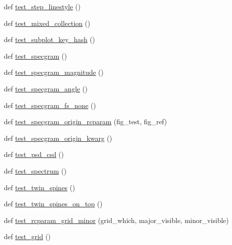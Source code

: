 \begin{DoxyCompactItemize}
def \hyperlink{namespacematplotlib_1_1tests_1_1test__axes_a3968f74ade34455d4fd9fc6a8c9f79fa}{test\+\_\+step\+\_\+linestyle} ()
\item 
def \hyperlink{namespacematplotlib_1_1tests_1_1test__axes_a5b3e3426d068fceaa96eb7402df6659e}{test\+\_\+mixed\+\_\+collection} ()
\item 
def \hyperlink{namespacematplotlib_1_1tests_1_1test__axes_abaa329e6b97af2289901e8470f4247af}{test\+\_\+subplot\+\_\+key\+\_\+hash} ()
\item 
def \hyperlink{namespacematplotlib_1_1tests_1_1test__axes_a42e09b62c07363864a009c6f719c16c6}{test\+\_\+specgram} ()
\item 
def \hyperlink{namespacematplotlib_1_1tests_1_1test__axes_a5d44d9810a3bea5b16c7dbfaadf011e2}{test\+\_\+specgram\+\_\+magnitude} ()
\item 
def \hyperlink{namespacematplotlib_1_1tests_1_1test__axes_a47b44086a29a8443df1f15fe6037384b}{test\+\_\+specgram\+\_\+angle} ()
\item 
def \hyperlink{namespacematplotlib_1_1tests_1_1test__axes_a409613fae86479e6aecf81f7f05dfb10}{test\+\_\+specgram\+\_\+fs\+\_\+none} ()
\item 
def \hyperlink{namespacematplotlib_1_1tests_1_1test__axes_acec6383a70126a71095e0bd77bb74a1c}{test\+\_\+specgram\+\_\+origin\+\_\+rcparam} (fig\+\_\+test, fig\+\_\+ref)
\item 
def \hyperlink{namespacematplotlib_1_1tests_1_1test__axes_a9d43d34c8d202b7fef3b8f85dbc5a52b}{test\+\_\+specgram\+\_\+origin\+\_\+kwarg} ()
\item 
def \hyperlink{namespacematplotlib_1_1tests_1_1test__axes_af47a1b688e1a35d8c6c4a29e396eb7f4}{test\+\_\+psd\+\_\+csd} ()
\item 
def \hyperlink{namespacematplotlib_1_1tests_1_1test__axes_af5aadab05b10db7c537df396f98f5201}{test\+\_\+spectrum} ()
\item 
def \hyperlink{namespacematplotlib_1_1tests_1_1test__axes_a2e9c2898906c337d906afcb525204788}{test\+\_\+twin\+\_\+spines} ()
\item 
def \hyperlink{namespacematplotlib_1_1tests_1_1test__axes_a851368f3596252fa866d222aab9696d8}{test\+\_\+twin\+\_\+spines\+\_\+on\+\_\+top} ()
\item 
def \hyperlink{namespacematplotlib_1_1tests_1_1test__axes_a2b583a4f23efc2848802a12e3b6f0b26}{test\+\_\+rcparam\+\_\+grid\+\_\+minor} (grid\+\_\+which, major\+\_\+visible, minor\+\_\+visible)
\item 
def \hyperlink{namespacematplotlib_1_1tests_1_1test__axes_a3226e9ef766aa6d198f206a0b33d062e}{test\+\_\+grid} ()

\end{DoxyCompactItemize}
